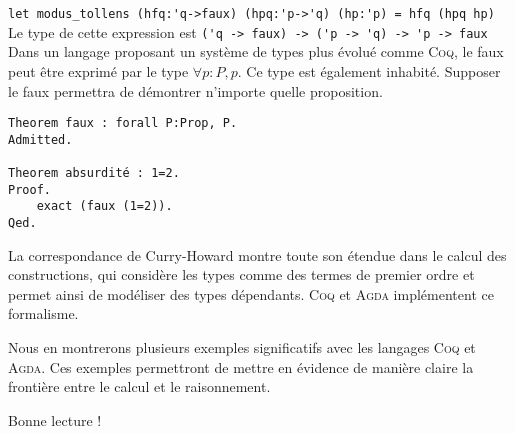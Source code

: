 \documentclass[11pt]{book}
\begin{document}
\verb+let modus_tollens (hfq:'q->faux) (hpq:'p->'q) (hp:'p) = hfq (hpq hp)+  \\
Le type de cette expression est  \verb+('q -> faux) -> ('p -> 'q) -> 'p -> faux+  \\

Dans un langage proposant un système de types plus évolué comme \textsc{Coq}, le faux peut être exprimé 
par le type $\forall p:P, p$. Ce type est également inhabité. Supposer le faux permettra de démontrer 
n'importe quelle proposition.

\begin{Verbatim}
Theorem faux : forall P:Prop, P.
Admitted.

Theorem absurdité : 1=2.
Proof.
    exact (faux (1=2)). 
Qed.
\end{Verbatim}

La correspondance de Curry-Howard montre toute son étendue dans le calcul des constructions, qui 
considère les types comme des termes de premier ordre et permet ainsi de modéliser des types dépendants.
\textsc{Coq} et \textsc{Agda} implémentent ce formalisme.

Nous en montrerons plusieurs exemples significatifs avec les langages \textsc{Coq} et \textsc{Agda}.
Ces exemples permettront de mettre en évidence de manière claire la frontière entre le calcul et
le raisonnement.

\vspace{0.3cm}
Bonne lecture !
















 
\end{document}
